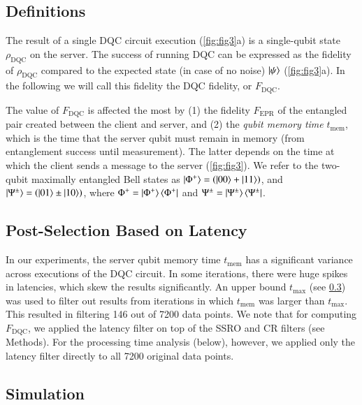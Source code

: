 \subsection{Definitions}

The result of a single \ac{DQC} circuit execution (\cref{fig:fig3}a) is a single-qubit state $\rho_{\text{DQC}}$ on the server. The success of running \ac{DQC} can be expressed as the fidelity of $\rho_{\text{DQC}}$ compared to the expected state (in case of no noise) $\ket{\psi}$ (\cref{fig:fig3}a). In the following we will call this fidelity the \ac{DQC} fidelity, or $F_{\text{DQC}}$.

The value of $F_{\text{DQC}}$ is affected the most by (1) the fidelity $F_{\text{EPR}}$ of the entangled pair created between the client and server, and (2) the \textit{qubit memory time} $t_{\text{mem}}$, which is the time that the server qubit must remain in memory (from entanglement success until measurement). The latter depends on the time at which the client sends a message to the server (\cref{fig:fig3}). We refer to the two-qubit maximally entangled Bell states as $\ket{\Phi^+} = \left(\ket{00} + \ket{11}\right)$, and $\ket{\Psi^{\pm}} = \left(\ket{01} \pm \ket{10}\right)$, where $\Phi^+ = \ket{\Phi^+}\bra{\Phi^+}$ and $\Psi^{\pm} = \ket{\Psi^{\pm}}\bra{\Psi^{\pm}}$.

\subsection{Post-Selection Based on Latency}
\label{sec:post-selection-latency}

In our experiments, the server qubit memory time $t_{\text{mem}}$ has a significant variance across executions of the \ac{DQC} circuit. In some iterations, there were huge spikes in latencies, which skew the results significantly. An upper bound $t_{\max}$ (see \cref{sec:dqc-simulation}) was used to filter out results from iterations in which $t_{\text{mem}}$ was larger than $t_{\max}$. This resulted in filtering 146 out of 7200 data points. We note that for computing $F_{\text{DQC}}$, we applied the latency filter on top of the \ac{SSRO} and \ac{CR} filters (see Methods). For the processing time analysis (below), however, we applied only the latency filter directly to all 7200 original data points.

\subsection{Simulation}
\label{sec:dqc-simulation}

